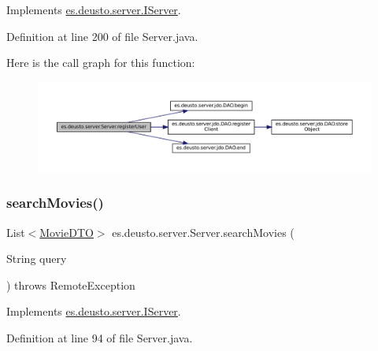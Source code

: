 Implements \mbox{\hyperlink{interfacees_1_1deusto_1_1server_1_1_i_server_a998e20655e760b135fab601a417aa5ae}{es.\+deusto.\+server.\+I\+Server}}.



Definition at line 200 of file Server.\+java.

Here is the call graph for this function\+:
\nopagebreak
\begin{figure}[H]
\begin{center}
\leavevmode
\includegraphics[width=350pt]{classes_1_1deusto_1_1server_1_1_server_a6a419bd82bce60f072b4c7f5a527abdc_cgraph}
\end{center}
\end{figure}
\mbox{\label{classes_1_1deusto_1_1server_1_1_server_a16789cc76edd46978ffbb58581caf5db}} 
\subsubsection{\texorpdfstring{searchMovies()}{searchMovies()}}
{\footnotesize\ttfamily List$<$\mbox{\hyperlink{classes_1_1deusto_1_1server_1_1data_1_1_movie_d_t_o}{Movie\+D\+TO}}$>$ es.\+deusto.\+server.\+Server.\+search\+Movies (\begin{DoxyParamCaption}\item[{String}]{query }\end{DoxyParamCaption}) throws Remote\+Exception}



Implements \mbox{\hyperlink{interfacees_1_1deusto_1_1server_1_1_i_server_a50b7dacdeb04d5f1ee3f3b59989ed117}{es.\+deusto.\+server.\+I\+Server}}.



Definition at line 94 of file Server.\+java.


